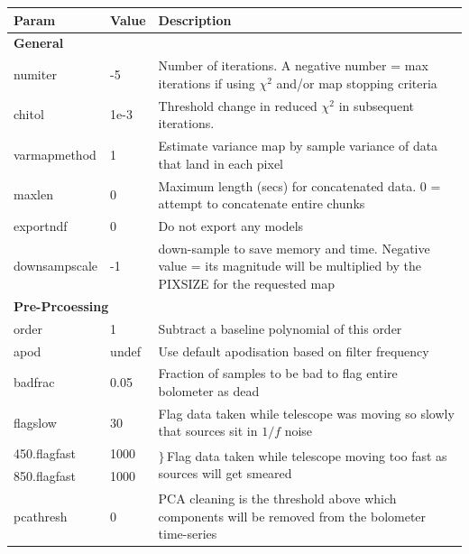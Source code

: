 \documentclass[twoside,11pt]{article}
\renewcommand{\_}{\texttt{\symbol{95}}}
\begin{document}
\renewcommand*\arraystretch{0.85}
\begin{table}
\begin{center}
\begin{footnotesize}
\begin{tabular}{|p{2.2cm}|p{1.1cm}|p{11.4cm}|}
\hline
Param & Value & Description \\
\hline
\multicolumn{3}{|l|}{\textbf{General}}\\
\hline
numiter &  -5 & Number of iterations. A negative number = max iterations if using $\chi^2$ and/or map stopping criteria\\
chitol & 1e-3 & Threshold change in reduced $\chi^2$ in subsequent iterations.\\
varmapmethod & 1& Estimate variance map by sample variance of data that land in each pixel\\
maxlen&  0&Maximum length (secs) for concatenated data. 0 = attempt to concatenate entire chunks\\
exportndf &0&Do not export any models\\
downsampscale   &-1&down-sample to save memory and time. Negative value = its magnitude will be multiplied by the PIXSIZE for the requested map\\
\hline
\multicolumn{3}{|l|}{\textbf{Pre-Prcoessing}}\\
\hline
order &1 &Subtract a baseline polynomial of this order\\
apod & undef&Use default apodisation based on filter frequency\\
badfrac& 0.05&Fraction of samples to be bad to flag entire bolometer as dead\\
flagslow & 30&Flag data taken while telescope was moving so slowly that sources sit in $1/f$ noise\\
450.flagfast &1000& \multirow{2}{*}{{\large$\rbrace$}\,Flag data taken while telescope moving too fast as sources will get smeared}\\
850.flagfast & 1000&\\
pcathresh &0& PCA cleaning is the threshold above which components will be removed from the bolometer time-series\\


\end{tabular}
\end{footnotesize}
\end{center}
\end{table}
\end{document}
